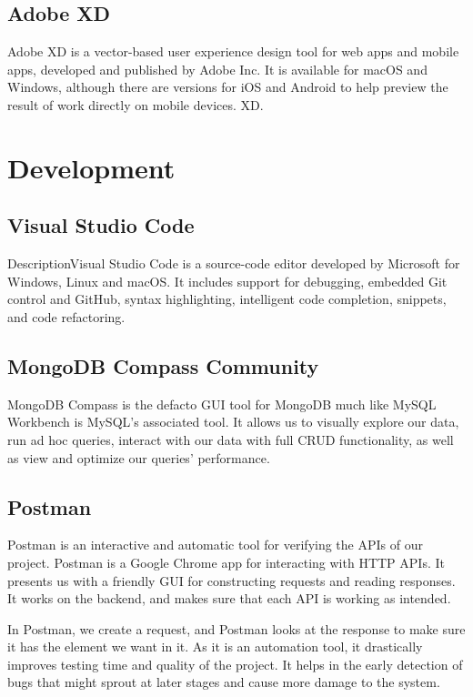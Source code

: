 \subsection{Adobe XD}
Adobe XD is a vector-based user experience design tool for web apps and mobile apps, developed and published by Adobe Inc. It is available for macOS and Windows, although there are versions for iOS and Android to help preview the result of work directly on mobile devices. XD.












\section{Development}
\subsection{Visual Studio Code}
DescriptionVisual Studio Code is a source-code editor developed by Microsoft for Windows, Linux and macOS. It includes support for debugging, embedded Git control and GitHub, syntax highlighting, intelligent code completion, snippets, and code refactoring.


\subsection{MongoDB Compass Community}
MongoDB Compass is the defacto GUI tool for MongoDB much like MySQL Workbench is MySQL’s associated tool. It allows us to visually explore our data, run ad hoc queries, interact with our data with full CRUD functionality, as well as view and optimize our queries’ performance.



\subsection{Postman}
Postman is an interactive and automatic tool for verifying the APIs of our project. Postman is a Google Chrome app for interacting with HTTP APIs. It presents us with a friendly GUI for constructing requests and reading responses. It works on the backend, and makes sure that each API is working as intended.

In Postman, we create a request, and Postman looks at the response to make sure it has the element we want in it. As it is an automation tool, it drastically improves testing time and quality of the project. It helps in the early detection of bugs that might sprout at later stages and cause more damage to the system.

